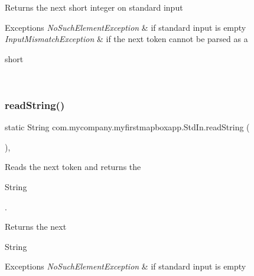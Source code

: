 \begin{DoxyReturn}{Returns}
the next short integer on standard input 
\end{DoxyReturn}

\begin{DoxyExceptions}{Exceptions}
{\em No\+Such\+Element\+Exception} & if standard input is empty \\
\hline
{\em Input\+Mismatch\+Exception} & if the next token cannot be parsed as a
\begin{DoxyCode}
\textcolor{keywordtype}{short} 
\end{DoxyCode}
 \\
\hline
\end{DoxyExceptions}
\mbox{\label{classcom_1_1mycompany_1_1myfirstmapboxapp_1_1_std_in_aa787874d0065ebeb864a06b137a0250e}} 
\subsubsection{\texorpdfstring{read\+String()}{readString()}}
{\footnotesize\ttfamily static String com.\+mycompany.\+myfirstmapboxapp.\+Std\+In.\+read\+String (\begin{DoxyParamCaption}{ }\end{DoxyParamCaption})\hspace{0.3cm}{\ttfamily [inline]}, {\ttfamily [static]}}

Reads the next token and returns the
\begin{DoxyCode}
String 
\end{DoxyCode}
 .

\begin{DoxyReturn}{Returns}
the next
\begin{DoxyCode}
String 
\end{DoxyCode}
 
\end{DoxyReturn}

\begin{DoxyExceptions}{Exceptions}
{\em No\+Such\+Element\+Exception} & if standard input is empty \\
\hline
\end{DoxyExceptions}
\mbox{\label{classcom_1_1mycompany_1_1myfirstmapboxapp_1_1_std_in_a0d21ccbc6af903cfe538b1cbb16c17d8}} 
